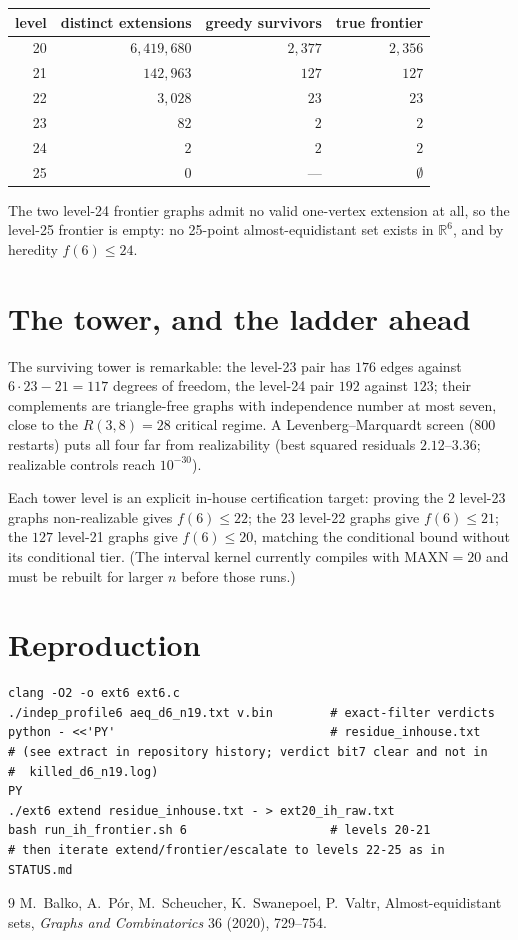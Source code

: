 \documentclass[11pt]{article}
\newcommand{\R}{\mathbb{R}}
\begin{document}
\begin{center}
\begin{tabular}{rrrr}
\toprule
level & distinct extensions & greedy survivors & true frontier\\
\midrule
20 & $6{,}419{,}680$ & $2{,}377$ & $2{,}356$\\
21 & $142{,}963$ & $127$ & $127$\\
22 & $3{,}028$ & $23$ & $23$\\
23 & $82$ & $2$ & $2$\\
24 & $2$ & $2$ & $2$\\
25 & $0$ & --- & $\emptyset$\\
\bottomrule
\end{tabular}
\end{center}

The two level-24 frontier graphs admit no valid one-vertex extension at
all, so the level-25 frontier is empty: no 25-point almost-equidistant
set exists in $\R^6$, and by heredity $f(6)\le 24$.

\section*{The tower, and the ladder ahead}

The surviving tower is remarkable: the level-23 pair has $176$ edges
against $6\cdot 23-21=117$ degrees of freedom, the level-24 pair $192$
against $123$; their complements are triangle-free graphs with
independence number at most seven, close to the $R(3,8)=28$ critical
regime. A Levenberg--Marquardt screen ($800$ restarts) puts all four far
from realizability (best squared residuals $2.12$--$3.36$; realizable
controls reach $10^{-30}$).

Each tower level is an explicit in-house certification target: proving
the $2$ level-23 graphs non-realizable gives $f(6)\le 22$; the $23$
level-22 graphs give $f(6)\le 21$; the $127$ level-21 graphs give
$f(6)\le 20$, matching the conditional bound without its conditional
tier. (The interval kernel currently compiles with $\mathrm{MAXN}=20$
and must be rebuilt for larger $n$ before those runs.)

\section*{Reproduction}

\begin{verbatim}
clang -O2 -o ext6 ext6.c
./indep_profile6 aeq_d6_n19.txt v.bin        # exact-filter verdicts
python - <<'PY'                              # residue_inhouse.txt
# (see extract in repository history; verdict bit7 clear and not in
#  killed_d6_n19.log)
PY
./ext6 extend residue_inhouse.txt - > ext20_ih_raw.txt
bash run_ih_frontier.sh 6                    # levels 20-21
# then iterate extend/frontier/escalate to levels 22-25 as in STATUS.md
\end{verbatim}

\begin{thebibliography}{9}
 M.~Balko, A.~P\'or, M.~Scheucher, K.~Swanepoel,
P.~Valtr, Almost-equidistant sets, \emph{Graphs and Combinatorics} 36
(2020), 729--754.
\end{thebibliography}
\end{document}
